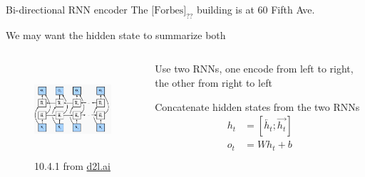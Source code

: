 \documentclass[usenames,dvipsnames,notes,11pt,aspectratio=169,hyperref={colorlinks=true, linkcolor=blue}]{beamer}
\begin{document}
\begin{frame}
    {Bi-directional RNN encoder}
    The $\text{[Forbes]}_{??}$ building is at 60 Fifth Ave.
    \pause

    We may want the hidden state to summarize both 
    \pause

    \medskip
    \begin{columns}
        \begin{column}{0.5\textwidth}
    \begin{figure}
        \includegraphics[height=3.5cm]{figures/birnn}
        \caption{10.4.1 from \href{https://d2l.ai/chapter_recurrent-modern/bi-rnn.html}{d2l.ai}}
    \end{figure}
        \end{column}
        \begin{column}{0.5\textwidth}
            \begin{wideitemize}
                \item Use two RNNs, one encode from left to right, the other from right to left
                \item Concatenate hidden states from the two RNNs
            \begin{align*}
                h_t &= [\overleftarrow{h_t}; \overrightarrow{h_t}]\\
                o_t &= Wh_t + b
            \end{align*}
            \end{wideitemize}
        \end{column}
    \end{columns}
\end{frame}
\end{document}
